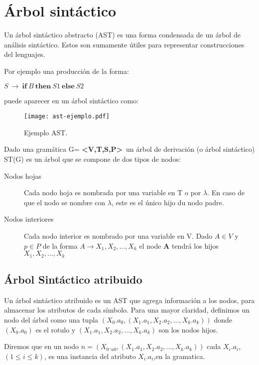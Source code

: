 \section{Árbol sintáctico}

Un árbol sintáctico abstracto (AST) es una forma condensada de un árbol de análisis sintáctico. Estos son sumamente útiles para representar construcciones del lenguajes.

Por ejemplo una producción de la forma:
\begin{center}\large
$S\ \rightarrow\ \textbf{if}\ B\ \textbf{then}\ S1\ \textbf{else}\ S2$                                                                      \end{center}
puede aparecer en un árbol sintáctico como:

\begin{figure}[h!]\centering
\texttt{[image: ast-ejemplo.pdf]}
\caption{\label{ejem-ast} Ejemplo AST.}
\end{figure}
\begin{definition}

Dado una gramática G= \textbf{<V,T,S,P>}\, un árbol de derivación (o árbol sintáctico)
ST(G) es un árbol que se compone de dos tipos de nodos:
\begin{description}
\item [Nodos hojas] Cada nodo hoja es nombrada por una variable en T o por $\lambda$. En caso de que el nodo se nombre con $\lambda$, este es el único hijo du nodo padre.
\item [Nodos interiores] Cada nodo interior es nombrado por una variable en V. Dado $A\in V$ y $p\in P$ de la forma $A\rightarrow X_{1},X_{2},\dots, X_{k}$ el node \textbf{A} tendrá los hijos $X_{1},X_{2},\dots, X_{k}$
\end{description}
\end{definition}
\subsection*{Árbol Sintáctico atribuido}

Un árbol sintáctico atribuido es un AST que agrega información a los nodos, para almacenar los atributos de cada símbolo.
Para una mayor claridad, definimos un nodo del árbol como una tupla $( X_{0}.a_0, (X_{1}.a_1,X_{2}.a_2,\ldots ,X_{k}.a_k) )$ donde $(X_{0}.a_0)$ es el rotulo y $(X_{1}.a_1,X_{2}.a_2,\ldots ,X_{k}.a_k)$ son los nodos hijos.

Diremos que en un nodo $n=( X_{0}._{a0}, (X_{1}.a_1,X_{2}.a_2,\ldots ,X_{k}.a_k) )$ cada $X_{i}.a_i$, $(1 \leq i \leq k)$, es una instancia del atributo $X_{i}.a_i$,en la gramatica.

